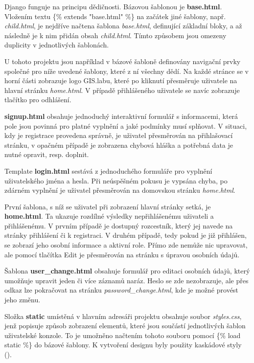 Django funguje na principu dědičnosti. Bázovou šablonou je
\textbf{base.html}. Vložením textu \textsf{\{\% extends "base.html"
  \%\}} na začátek jiné šablony, např. \textit{child.html}, je
nejdříve načtena šablona \textit{base.html}, definující základní
bloky, a až následně je k nim přidán obsah \textit{child.html}. Tímto
způsobem jsou omezeny duplicity v jednotlivých šablonách.

U tohoto projektu jsou například v bázové šabloně definovány navigační
prvky společné pro níže uvedené šablony, které z ní všechny dědí. Na
každé stránce se v horní části zobrazuje logo GIS.labu, které po
kliknutí přesměruje uživatele na hlavní stránku \textit{home.html}. V
případě přihlášeného uživatele se navíc zobrazuje tlačítko pro
odhlášení.

\textbf{signup.html} obsahuje jednoduchý interaktivní formulář s
informacemi, která pole jsou povinná pro platné vyplnění a jaké
podmínky musí splňovat. V situaci, kdy je registrace provedena
správně, je uživatel přesměrován na přihlašovací stránku, v opačném
případě je zobrazena chybová hláška a potřebná data je nutné opravit,
resp. doplnit.

Template \textbf{login.html} sestává z jednoduchého formuláře pro
vyplnění uživatelského jména a hesla. Při neúspěšném pokusu je vypsána
chyba, po zdárném vyplnění je uživatel přesměrován na domovskou
stránku \textit{home.html}.

První šablona, s níž se uživatel při zobrazení hlavní stránky setká,
je \textbf{home.html}. Ta ukazuje rozdílné výsledky nepřihlášenému
uživateli a přihlášenému. V prvním případě je dostupný rozcestník,
který jej navede na stránky přihlášení či k registraci. V druhém
případě, tedy pokud je již přihlášen, se zobrazí jeho osobní informace
a aktivní role. Přímo zde nemůže nic upravovat, ale pomocí tlačítka
\textsf{Edit} je přesměrován na stránku s úpravou osobních údajů.

Šablona \textbf{user\_change.html} obsahuje formulář pro editaci
osobních údajů, který umožňuje upravit jeden či více záznamů
naráz. Heslo se zde nezobrazuje, ale přes odkaz lze pokračovat na
stránku \textit{password\_change.html}, kde je možné provést jeho
změnu.

Složka \textbf{static} umístěná v hlavním adresáři projektu obsahuje
soubor \textit{styles.css}, jenž popisuje způsob zobrazení elementů,
které jsou součástí jednotlivých šablon uživatelské konzole. To je
umožněno načtením tohoto souboru pomocí \textsf{\{\% load static \%\}}
do bázové šablony. K vytvoření designu byly použity kaskádové styly
().

